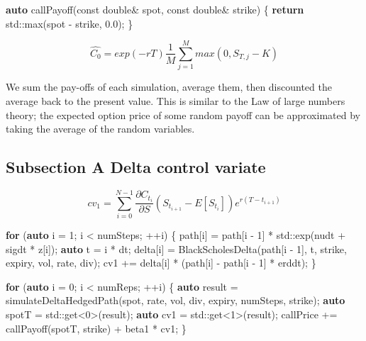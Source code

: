 \documentclass[11pt,]{article}
\newenvironment{Shaded}{\begin{snugshade}}{\end{snugshade}}
\newcommand{\AttributeTok}[1]{\textcolor[rgb]{0.77,0.63,0.00}{#1}}
\newcommand{\BuiltInTok}[1]{#1}
\newcommand{\ControlFlowTok}[1]{\textcolor[rgb]{0.13,0.29,0.53}{\textbf{#1}}}
\newcommand{\DataTypeTok}[1]{\textcolor[rgb]{0.13,0.29,0.53}{#1}}
\newcommand{\DecValTok}[1]{\textcolor[rgb]{0.00,0.00,0.81}{#1}}
\newcommand{\FloatTok}[1]{\textcolor[rgb]{0.00,0.00,0.81}{#1}}
\newcommand{\KeywordTok}[1]{\textcolor[rgb]{0.13,0.29,0.53}{\textbf{#1}}}
\newcommand{\NormalTok}[1]{#1}
\begin{document}
\begin{Shaded}
\begin{Highlighting}[]
\KeywordTok{auto}\NormalTok{ callPayoff(}\AttributeTok{const} \DataTypeTok{double}\NormalTok{& spot, }\AttributeTok{const} \DataTypeTok{double}\NormalTok{& strike)}
\NormalTok{\{}
    \ControlFlowTok{return} \BuiltInTok{std::}\NormalTok{max(spot - strike, }\FloatTok{0.0}\NormalTok{);}
\NormalTok{\}}
\end{Highlighting}
\end{Shaded}

\[
\hat{C_0} = exp(-rT)\frac{1}{M}\sum^M_{j=1} max(0, S_{T,j} - K)
\]

We sum the pay-offs of each simulation, average them, then discounted
the average back to the present value. This is similar to the Law of
large numbers theory; the expected option price of some random payoff
can be approximated by taking the average of the random variables.

\hypertarget{subsection-a-delta-control-variate}{%
\subsection{Subsection A Delta control
variate}\label{subsection-a-delta-control-variate}}

\[
cv_1 = \sum^{N-1}_{i=0} \frac{\partial C_{t_i}}{\partial S}(S_{t_{i+1}}-E[S_{t_i}])e^{r(T-t_{i+1})}
\]

\begin{Shaded}
\begin{Highlighting}[]
\ControlFlowTok{for}\NormalTok{ (}\KeywordTok{auto}\NormalTok{ i = }\DecValTok{1}\NormalTok{; i < numSteps; ++i)}
\NormalTok{    \{}
\NormalTok{        path[i] = path[i - }\DecValTok{1}\NormalTok{] * }\BuiltInTok{std::}\NormalTok{exp(nudt + sigdt * z[i]);}
        \KeywordTok{auto}\NormalTok{ t = i * dt;}
\NormalTok{        delta[i] = BlackScholesDelta(path[i - }\DecValTok{1}\NormalTok{], t, strike, expiry, vol, rate, div);}
\NormalTok{        cv1 += delta[i] * (path[i] - path[i - }\DecValTok{1}\NormalTok{] * erddt);}
\NormalTok{    \}}

\ControlFlowTok{for}\NormalTok{ (}\KeywordTok{auto}\NormalTok{ i = }\DecValTok{0}\NormalTok{; i < numReps; ++i)}
\NormalTok{    \{}
        \KeywordTok{auto}\NormalTok{ result = simulateDeltaHedgedPath(spot, rate, vol, div, expiry, numSteps, strike);}
        \KeywordTok{auto}\NormalTok{ spotT = }\BuiltInTok{std::}\NormalTok{get<}\DecValTok{0}\NormalTok{>(result);}
        \KeywordTok{auto}\NormalTok{ cv1 = }\BuiltInTok{std::}\NormalTok{get<}\DecValTok{1}\NormalTok{>(result);}
\NormalTok{        callPrice += callPayoff(spotT, strike) + beta1 * cv1;}
\NormalTok{    \}}
\end{Highlighting}
\end{Shaded}
\end{document}
